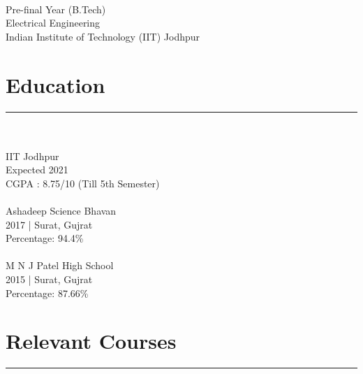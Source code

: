 \documentclass[]{resume}
\begin{document}
%
%

\begin{minipage}[t]{0.33\textwidth} 
\vspace{-2em}
\begin{large}
	\\
\end{large}
Pre-final Year (B.Tech)\\
Electrical  Engineering\\ 
Indian Institute of Technology (IIT) Jodhpur  \\ 
\vspace{-1em}
\section{Education}
\vspace{-0.5em}
\noindent\rule{5cm}{0.4pt}\\

\vspace{-0.7em}
\\
IIT Jodhpur \\
Expected 2021\\
CGPA : 8.75/10 (Till 5th Semester)\\

\vspace{-0.5em}
\\
Ashadeep Science Bhavan\\
2017 | Surat, Gujrat \\
Percentage: 94.4\%\\

\vspace{-0.5em}
\\
M N J Patel High School\\
2015 | Surat, Gujrat \\
Percentage: 87.66\%\\
\sectionsep

\vspace{-1.5em}
\section{Relevant Courses}
\vspace{-0.5em}
\noindent\rule{5cm}{0.4pt}\\


\end{minipage}
\end{document}
